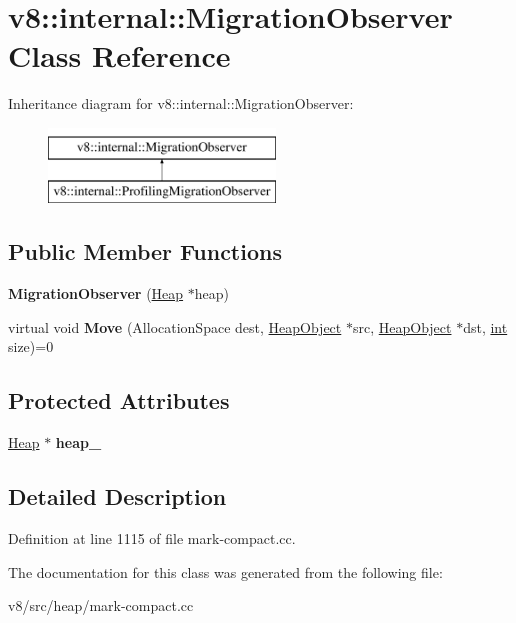 \hypertarget{classv8_1_1internal_1_1MigrationObserver}{}\section{v8\+:\+:internal\+:\+:Migration\+Observer Class Reference}
\label{classv8_1_1internal_1_1MigrationObserver}
Inheritance diagram for v8\+:\+:internal\+:\+:Migration\+Observer\+:\begin{figure}[H]
\begin{center}
\leavevmode
\includegraphics[height=2.000000cm]{classv8_1_1internal_1_1MigrationObserver}
\end{center}
\end{figure}
\subsection*{Public Member Functions}
\begin{DoxyCompactItemize}
\item 
\mbox{\label{classv8_1_1internal_1_1MigrationObserver_a6908dc5cb778073789390891215ce21d}} 
{\bfseries Migration\+Observer} (\mbox{\hyperlink{classv8_1_1internal_1_1Heap}{Heap}} $\ast$heap)
\item 
\mbox{\label{classv8_1_1internal_1_1MigrationObserver_ac82001118d6813582e76614a83b6d7a1}} 
virtual void {\bfseries Move} (Allocation\+Space dest, \mbox{\hyperlink{classv8_1_1internal_1_1HeapObject}{Heap\+Object}} $\ast$src, \mbox{\hyperlink{classv8_1_1internal_1_1HeapObject}{Heap\+Object}} $\ast$dst, \mbox{\hyperlink{classint}{int}} size)=0
\end{DoxyCompactItemize}
\subsection*{Protected Attributes}
\begin{DoxyCompactItemize}
\item 
\mbox{\label{classv8_1_1internal_1_1MigrationObserver_afd906cd01456da8dca0f62cde32cae64}} 
\mbox{\hyperlink{classv8_1_1internal_1_1Heap}{Heap}} $\ast$ {\bfseries heap\+\_\+}
\end{DoxyCompactItemize}


\subsection{Detailed Description}


Definition at line 1115 of file mark-\/compact.\+cc.



The documentation for this class was generated from the following file\+:\begin{DoxyCompactItemize}
\item 
v8/src/heap/mark-\/compact.\+cc\end{DoxyCompactItemize}
